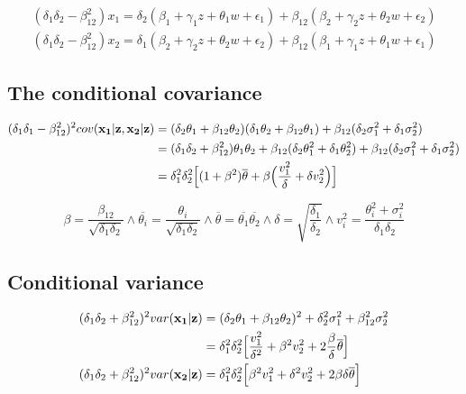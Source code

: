 \documentclass[12pt]{article}
\begin{document}
\begin{align}
(\delta_1 \delta_2 - \beta_{12} ^ 2) x_1 =
  \delta_2 (\beta_1 + \gamma_1 z + \theta_1 w + \epsilon_1) +
  \beta_{12} (\beta_2 + \gamma_2 z + \theta_2 w + \epsilon_2) \nonumber \\
(\delta_1 \delta_2 - \beta_{12} ^ 2) x_2 =
  \delta_1 (\beta_2 + \gamma_2 z + \theta_2 w + \epsilon_2) +
  \beta_{12} (\beta_1 + \gamma_1 z + \theta_1 w + \epsilon_1)
\end{align}

\subsection{The conditional
covariance}\label{the-conditional-covariance}

\begin{align}
(\delta_1 \delta_1 - \beta_{12}^2)^2 cov(\mathbf{x_1 | z, x_2 | z})
&=
(\delta_2 \theta_1 + \beta_{12} \theta_2)(\delta_1 \theta_2 + \beta_{12} \theta_1)
+ \beta_{12} (\delta_2 \sigma_1^2 + \delta_1\sigma_2^2) \nonumber \\
&=
(\delta_1 \delta_2 + \beta_{12}^2) \theta_1 \theta_2
+ \beta_{12}(\delta_2 \theta_1^2 + \delta_1 \theta_2^2)
+ \beta_{12} (\delta_2 \sigma_1^2 + \delta_1\sigma_2^2) \nonumber \\
&=
\delta_1^2 \delta_2^2 \Bigl [(1 + \beta^2) \overline{\theta} +
\beta \Bigl (\frac{v_1^2}{\delta} + \delta v_2^2 \Bigr) \Bigr]
\end{align}

\[
\beta = \frac{\beta_{12}}{\sqrt{\delta_1 \delta_2}} \land
\overline{\theta_i} = \frac{\theta_i}{\sqrt{\delta_1 \delta_2}} \land
\overline{\theta} = \overline{\theta_1} \overline{\theta_2} \land
\delta = \sqrt{\frac{\delta_1}{\delta_2}} \land
v_i^2 = \frac{\theta_i^2 + \sigma_i^2}{\delta_1 \delta_2}
\]

\subsection{Conditional variance}\label{conditional-variance}

\begin{align}
(\delta_1 \delta_2 + \beta_{12}^2)^2 var(\mathbf{x_1 | z})
&=
(\delta_2 \theta_1 + \beta_{12} \theta_2)^2
+ \delta_2^2 \sigma_1^2 + \beta_{12}^2 \sigma^2_2 \nonumber \\
&=
\delta_1^2 \delta_2^2 \Bigl [
\frac{v^2_1}{\delta^2} + \beta^2 v^2_2
+ 2 \frac{\beta}{\delta} \overline{\theta} \Bigr ]\\
(\delta_1 \delta_2 + \beta_{12}^2)^2 var(\mathbf{x_2 | z})
&=
\delta_1^2 \delta_2^2 \Bigl [
\beta^2 v_1^2 + \delta^2 v^2_2
+ 2 \beta \delta \overline{\theta}
\Bigr ]
\end{align}
\end{document}
